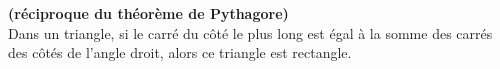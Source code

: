 
\textbf{(\og réciproque \fg{} du théorème de Pythagore)}\\ 
Dans un triangle, si le carré du côté le plus long est égal à la somme des carrés des côtés de l'angle droit, alors ce triangle est rectangle.
